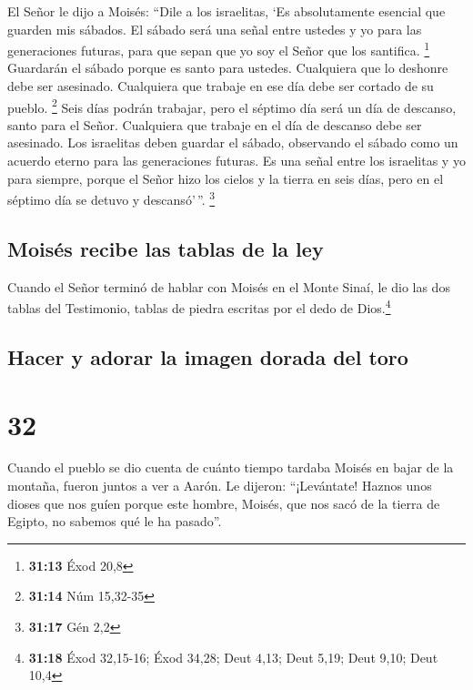  El Señor le dijo a Moisés:  ``Dile a los
israelitas, `Es absolutamente esencial que guarden mis sábados. El
sábado será una señal entre ustedes y yo para las generaciones futuras,
para que sepan que yo soy el Señor que los santifica. \footnote{\textbf{31:13}
  Éxod 20,8}  Guardarán el sábado porque es santo para
ustedes. Cualquiera que lo deshonre debe ser asesinado. Cualquiera que
trabaje en ese día debe ser cortado de su pueblo. \footnote{\textbf{31:14}
  Núm 15,32-35}  Seis días podrán trabajar, pero el
séptimo día será un día de descanso, santo para el Señor. Cualquiera que
trabaje en el día de descanso debe ser asesinado.  Los
israelitas deben guardar el sábado, observando el sábado como un acuerdo
eterno para las generaciones futuras.  Es una señal entre
los israelitas y yo para siempre, porque el Señor hizo los cielos y la
tierra en seis días, pero en el séptimo día se detuvo y descansó'\,''.
\footnote{\textbf{31:17} Gén 2,2}

\hypertarget{moisuxe9s-recibe-las-tablas-de-la-ley}{%
\subsection{Moisés recibe las tablas de la
ley}\label{moisuxe9s-recibe-las-tablas-de-la-ley}}

 Cuando el Señor terminó de hablar con Moisés en el Monte
Sinaí, le dio las dos tablas del Testimonio, tablas de piedra escritas
por el dedo de Dios.\footnote{\textbf{31:18} Éxod 32,15-16; Éxod 34,28;
  Deut 4,13; Deut 5,19; Deut 9,10; Deut 10,4}

\hypertarget{hacer-y-adorar-la-imagen-dorada-del-toro}{%
\subsection{Hacer y adorar la imagen dorada del
toro}\label{hacer-y-adorar-la-imagen-dorada-del-toro}}

\hypertarget{section-31}{%
\section{32}\label{section-31}}

 Cuando el pueblo se dio cuenta de cuánto tiempo tardaba
Moisés en bajar de la montaña, fueron juntos a ver a Aarón. Le dijeron:
``¡Levántate! Haznos unos dioses que nos guíen porque este hombre,
Moisés, que nos sacó de la tierra de Egipto, no sabemos qué le ha
pasado''.

